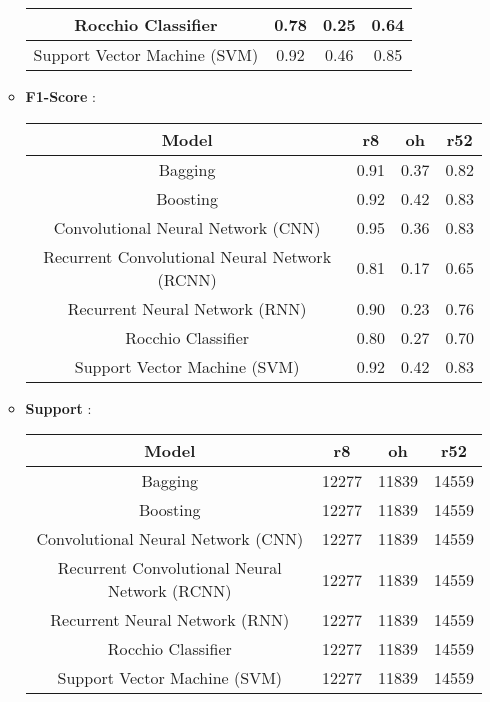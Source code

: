 \begin{itemize}
\begin{itemize}
\begin{tabular}{|c|c|c|c|}
                Rocchio Classifier & 0.78 & 0.25 & 0.64 \\\hline
                Support Vector Machine (SVM) & 0.92 & 0.46 & 0.85 \\\hline
            \end{tabular}
        \item \textbf{F1-Score} :
            \newline
            \begin{tabular}{|c|c|c|c|}\hline
                Model & r8 & oh & r52 \\\hline
                Bagging & 0.91 & 0.37 & 0.82 \\\hline
                Boosting & 0.92 & 0.42 & 0.83 \\\hline
                Convolutional Neural Network (CNN) & 0.95 & 0.36 & 0.83 \\\hline
                Recurrent Convolutional Neural Network (RCNN) & 0.81 & 0.17 & 0.65 \\\hline
                Recurrent Neural Network (RNN) & 0.90 & 0.23 & 0.76 \\\hline
                Rocchio Classifier & 0.80 & 0.27 & 0.70 \\\hline
                Support Vector Machine (SVM) & 0.92 & 0.42 & 0.83 \\\hline
            \end{tabular}
        \item \textbf{Support} :
            \newline
            \begin{tabular}{|c|c|c|c|}\hline
                Model & r8 & oh & r52 \\\hline
                Bagging & 12277 & 11839 & 14559 \\\hline
                Boosting & 12277 & 11839 & 14559 \\\hline
                Convolutional Neural Network (CNN) & 12277 & 11839 & 14559 \\\hline
                Recurrent Convolutional Neural Network (RCNN) & 12277 & 11839 & 14559 \\\hline
                Recurrent Neural Network (RNN) & 12277 & 11839 & 14559 \\\hline
                Rocchio Classifier & 12277 & 11839 & 14559 \\\hline
                Support Vector Machine (SVM) & 12277 & 11839 & 14559 \\\hline
            \end{tabular}

\end{itemize}
\end{itemize}

